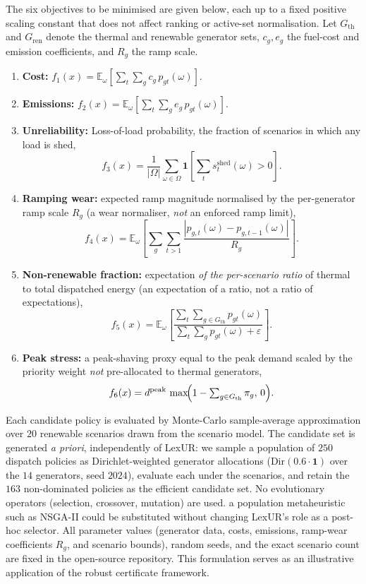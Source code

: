 The six objectives to be minimised are given below, each up to a fixed positive
scaling constant that does not affect ranking or active-set normalisation. Let
$G_{\mathrm{th}}$ and $G_{\mathrm{ren}}$ denote the thermal and renewable generator
sets, $c_g,e_g$ the fuel-cost and emission coefficients, and $R_g$ the ramp scale.
\begin{enumerate}
    \item \textbf{Cost:} $f_1(x)=\mathbb{E}_\omega\!\left[\sum_{t}\sum_{g} c_g\,p_{gt}(\omega)\right]$.
    \item \textbf{Emissions:} $f_2(x)=\mathbb{E}_\omega\!\left[\sum_{t}\sum_{g} e_g\,p_{gt}(\omega)\right]$.
    \item \textbf{Unreliability:} Loss-of-load probability, the fraction of scenarios in which any load is shed,
    \[ f_3(x)=\frac{1}{|\Omega|}\sum_{\omega\in\Omega}\mathbf 1\!\left[\sum_t s_t^{\mathrm{shed}}(\omega)>0\right]. \]
    \item \textbf{Ramping wear:} expected ramp magnitude normalised by the per-generator ramp scale $R_g$ (a wear normaliser, \emph{not} an enforced ramp limit),
    \[ f_4(x)=\mathbb{E}_\omega\!\left[\sum_{g}\sum_{t>1} \frac{|p_{g,t}(\omega)-p_{g,t-1}(\omega)|}{R_g}\right]. \]
    \item \textbf{Non-renewable fraction:} expectation \emph{of the per-scenario ratio} of thermal to total dispatched energy (an expectation of a ratio, not a ratio of expectations),
    \[ f_5(x)=\mathbb{E}_\omega\!\left[\frac{\sum_{t}\sum_{g\in G_{\mathrm{th}}} p_{gt}(\omega)}{\sum_{t}\sum_{g} p_{gt}(\omega)+\varepsilon}\right]. \]
    \item \textbf{Peak stress:} a peak-shaving proxy equal to the peak demand scaled by the priority weight \emph{not} pre-allocated to thermal generators,
    \[ f_6(x)=d^{\mathrm{peak}}\,\max\!\Bigl(1-\textstyle\sum_{g\in G_{\mathrm{th}}}\pi_g,\,0\Bigr). \]
\end{enumerate}

Each candidate policy is evaluated by Monte-Carlo sample-average approximation over $20$ renewable scenarios drawn from the scenario model. The candidate set is generated \emph{a priori}, independently of LexUR: we sample a population of $250$ dispatch policies as Dirichlet-weighted generator allocations ($\mathrm{Dir}(0.6\cdot\mathbf 1)$ over the $14$ generators, seed $2024$), evaluate each under the scenarios, and retain the $163$ non-dominated policies as the efficient candidate set. No evolutionary operators (selection, crossover, mutation) are used. a population metaheuristic such as NSGA-II could be substituted without changing LexUR's role as a post-hoc selector. All parameter values (generator data, costs, emissions, ramp-wear coefficients $R_g$, and scenario bounds), random seeds, and the exact scenario count are fixed in the open-source repository. This formulation serves as an illustrative application of the robust certificate framework.

